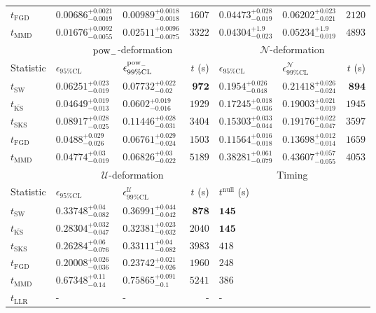 \begin{tabular}{l|llr|llr}
	$t_{\mathrm{FGD}}$ & ${\mathbf{0.00686_{-0.0019}^{+0.0021}}}$ & ${\mathbf{0.00989_{-0.0018}^{+0.0018}}}$ & $1607$ & $0.04473_{-0.019}^{+0.028}$ & $0.06202_{-0.021}^{+0.023}$ & $2120$ \\
	$t_{\mathrm{MMD}}$ & $0.01676_{-0.0055}^{+0.0092}$ & $0.02511_{-0.0075}^{+0.0096}$ & $3322$ & ${\mathbf{0.04304_{-0.023}^{+1.9}}}$ & ${\mathbf{0.05234_{-0.019}^{+1.9}}}$ & $4893$ \\
	\toprule
	\multicolumn{1}{c}{} & \multicolumn{3}{c}{$\rm{pow}_{-}$-deformation} & \multicolumn{3}{c}{$\mathcal{N}$-deformation} \\
	Statistic & $\epsilon_{95\%\mathrm{CL}}$ & $\epsilon^  {\rm{pow}_{-}}_{99\%\mathrm{CL}}$ & $t$ (s) & $\epsilon_{95\%\mathrm{CL}}$ & $\epsilon^    {\mathcal{N}}_{99\%\mathrm{CL}}$ & $t$ (s) \\
	\midrule
	$t_{\mathrm{SW}}$ & $0.06251_{-0.019}^{+0.023}$ & $0.07732_{-0.02}^{+0.022}$ & ${\mathbf{972}}$ & $0.1954_{-0.048}^{+0.026}$ & $0.21418_{-0.024}^{+0.026}$ & ${\mathbf{894}}$ \\
	$t_{\overline{\mathrm{KS}}}$ & ${\mathbf{0.04649_{-0.013}^{+0.019}}}$ & ${\mathbf{0.0602_{-0.016}^{+0.019}}}$ & $1929$ & $0.17245_{-0.036}^{+0.018}$ & $0.19003_{-0.019}^{+0.021}$ & $1945$ \\
	$t_{\mathrm{SKS}}$ & $0.08917_{-0.025}^{+0.028}$ & $0.11446_{-0.031}^{+0.028}$ & $3404$ & $0.15303_{-0.044}^{+0.033}$ & $0.19176_{-0.047}^{+0.022}$ & $3597$ \\
	$t_{\mathrm{FGD}}$ & $0.0488_{-0.026}^{+0.029}$ & $0.06761_{-0.024}^{+0.029}$ & $1503$ & ${\mathbf{0.11564_{-0.018}^{+0.016}}}$ & ${\mathbf{0.13698_{-0.014}^{+0.012}}}$ & $1659$ \\
	$t_{\mathrm{MMD}}$ & $0.04774_{-0.019}^{+0.03}$ & $0.06826_{-0.022}^{+0.03}$ & $5189$ & $0.38281_{-0.079}^{+0.061}$ & $0.43607_{-0.055}^{+0.057}$ & $4053$ \\
	\toprule
	\multicolumn{1}{c}{} & \multicolumn{3}{c}{$\mathcal{U}$-deformation} & \multicolumn{3}{c}{Timing} \\
	Statistic & $\epsilon_{95\%\mathrm{CL}}$ & $\epsilon^    {\mathcal{U}}_{99\%\mathrm{CL}}$ & $t$ (s) & $t^{\mathrm{null}}$ (s) \\
	\midrule
	$t_{\mathrm{SW}}$ & $0.33748_{-0.082}^{+0.04}$ & $0.36991_{-0.042}^{+0.044}$ & ${\mathbf{878}}$ & ${\mathbf{145}}$ \\
	$t_{\overline{\mathrm{KS}}}$ & $0.28304_{-0.047}^{+0.032}$ & $0.32381_{-0.032}^{+0.023}$ & $2040$ & ${\mathbf{145}}$ \\
	$t_{\mathrm{SKS}}$ & $0.26284_{-0.076}^{+0.06}$ & $0.33111_{-0.082}^{+0.04}$ & $3983$ & $418$ \\
	$t_{\mathrm{FGD}}$ & ${\mathbf{0.20008_{-0.036}^{+0.026}}}$ & ${\mathbf{0.23742_{-0.026}^{+0.021}}}$ & $1960$ & $248$ \\
	$t_{\mathrm{MMD}}$ & $0.67348_{-0.14}^{+0.11}$ & $0.75865_{-0.1}^{+0.091}$ & $5241$ & $386$ \\
	$t_{\mathrm{LLR}}$ & - & - & - & - \\
	\bottomrule
\end{tabular}